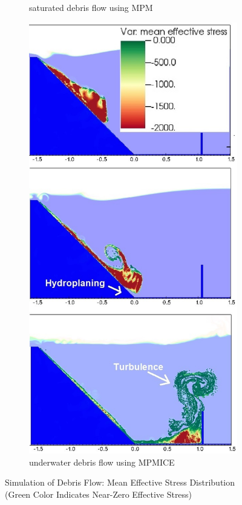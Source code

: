 \documentclass[preprint,12pt]{elsarticle}
\begin{document}
\begin{figure}[H]
\begin{subfigure}[c]{0.5\linewidth}
\caption{saturated debris flow using MPM}
\label{saturatedflowa}
\end {subfigure}\hfill    
\begin{subfigure}[d]{0.5\linewidth}
\includegraphics[width=\linewidth]{MPMICE_debris.jpg}
\caption{underwater debris flow using MPMICE}
\label{saturatedflowb}
\end {subfigure}
\caption{Simulation of Debris Flow: Mean Effective Stress Distribution (Green Color Indicates Near-Zero Effective Stress)}
\label{saturatedflow}
\end {figure}
\end{document}
